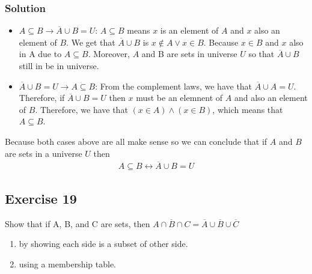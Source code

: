 \documentclass{article}
\theoremstyle{mytheoremstyle}
\theoremstyle{mytheoremstyle}
\theoremstyle{myproblemstyle}
\begin{document}
    \subsubsection*{Solution}
        \begin{itemize}
            \item \(A \subseteq B \to \overline{A}\cup B=U\): \(A \subseteq B\) means \(x\) is an element of \(A\) and \(x\) also an element of \(B\).
            We get that \(\overline{A} \cup B\) is \(x \notin A \lor x \in B\). Because \(x \in B\) and \(x\) also in A due to \(A \subseteq B\). Moreover, \(A\)
            and B are sets in universe \(U\) so that \(\overline{A} \cup B\) still in be in universe.
            \item \(\overline{A} \cup B = U \to A \subseteq B\): From the complement laws, we have that \(\overline{A} \cup A = U\). Therefore,
            if \(\overline{A} \cup B = U\) then \(x\) must be an elemnent of \(A\) and also an element of \(B\). Therefore, we have that
            \((x \in A) \land (x \in B)\), which means that \(A \subseteq B\).
        \end{itemize}
        Because both cases above are all make sense so we can conclude that if \(A\) and \(B\) are sets in a universe \(U\) then
        \begin{align*}
            A \subseteq B \leftrightarrow \overline{A} \cup B = U 
        \end{align*}
    \subsection*{Exercise 19}
        Show that if A, B, and C are sets, then \(\overline{A \cap B \cap C} = \overline{A} \cup \overline{B} \cup \overline{C}\)
        \begin{enumerate} [label = (\alph*)]
            \item by showing each side is a subset of other side.
            \item using a membership table.
        \end{enumerate}
\end{document}
